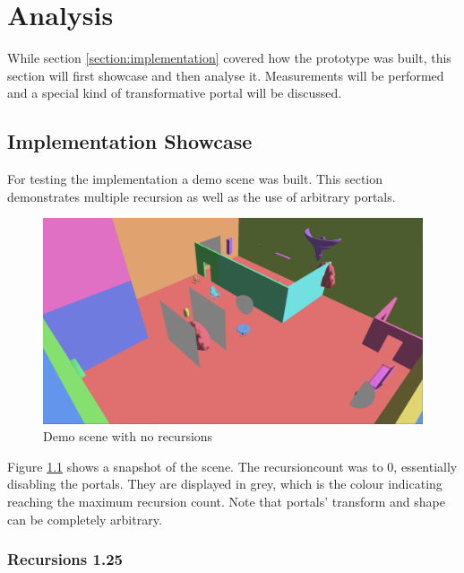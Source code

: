 \chapter{Analysis}
While section \ref{section:implementation} covered how the prototype was built, this section will first showcase and then analyse it. Measurements will be performed and a special kind of transformative portal will be discussed.

\section{Implementation Showcase}

For testing the implementation a demo scene was built. This section demonstrates multiple recursion as well as the use of arbitrary portals.

\begin{figure}[H]
	\centering
	\includegraphics[width=\linewidth]{images/portals.png}
	\caption{Demo scene with no recursions}
	\label{fig:demodisabled}
\end{figure}


Figure \ref{fig:demodisabled} shows a snapshot of the scene. The \gls{recursioncount} was to 0, essentially disabling the portals. They are displayed in grey, which is the colour indicating reaching the maximum recursion count. Note that portals' transform and shape can be completely arbitrary.

\subsection{Recursions 1.25}

